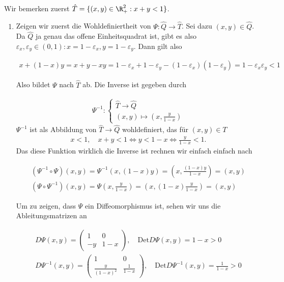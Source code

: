 \begin{solution}

Wir bemerken zuerst $\hat{T} = \{(x,y) \in \R_+^2: x + y < 1\}$.

\begin{enumerate}[label = \textbf{\alph*)}]
  \item Zeigen wir zuerst die Wohldefiniertheit von $\Psi: \hat{Q} \rightarrow \hat{T}$.
  Sei dazu $(x,y) \in \hat{Q}$. Da $\hat{Q}$ ja genau das offene Einheitsquadrat ist,
  gibt es also $\varepsilon_x, \varepsilon_y \in (0,1): x = 1 - \varepsilon_x, y = 1 -\varepsilon_y$. Dann gilt also

  \begin{align*}
    x + (1-x)y
    =
    x + y - xy
    =
    1 - \varepsilon_x + 1 - \varepsilon_y - (1 - \varepsilon_x)(1 - \varepsilon_y)
    =
    1 - \varepsilon_x \varepsilon_y
    <
    1
  \end{align*}

  Also bildet $\Psi$ nach $\hat{T}$ ab. Die Inverse ist gegeben durch

  \begin{align*}
    \Psi^{-1}: \begin{cases}
    \hat{T} \rightarrow \hat{Q} \\
    (x,y) \mapsto (x, \frac{y}{1-x})
    \end{cases}
  \end{align*}
 $\Psi^{-1}$ ist als Abbildung von $\hat{T} \to \hat{Q}$ wohldefiniert, das für $(x,y) \in T$
 \begin{align*}
   x < 1, \quad x+y < 1 \iff y < 1 - x \iff \frac{y}{1-x} < 1.
 \end{align*}
  Das diese Funktion wirklich die Inverse ist rechnen wir einfach einfach nach

  \begin{align*}
    (\Psi^{-1} \circ \Psi)(x,y)
    =
    \Psi^{-1}(x,(1-x)y)
    =
    \left(x, \frac{(1-x)y}{1-x}\right)
    =
    (x,y) \\
    (\Psi \circ \Psi^{-1})(x,y)
    =
    \Psi\left(x, \frac{y}{1-x}\right)
    =
    \left(x,(1-x)\frac{y}{1-x}\right)
    =
    (x,y)
  \end{align*}

  Um zu zeigen, dass $\Psi$ ein Diffeomorphismus ist, sehen wir uns die Ableitungsmatrizen an

  \begin{align*}
    D\Psi(x,y)
    =
    \begin{pmatrix}
      1 & 0 \\
      -y & 1-x
    \end{pmatrix}, \quad \mathrm{Det} D\Psi(x,y) = 1 - x > 0 \\
    D\Psi^{-1}(x,y)
    =
    \begin{pmatrix}
      1 & 0 \\
      \frac{y}{(1-x)^2} & \frac{1}{1-x}
    \end{pmatrix}, \quad \mathrm{Det} D\Psi^{-1}(x,y) = \frac{1}{1-x} > 0
  \end{align*}


\end{enumerate}
\end{solution}
